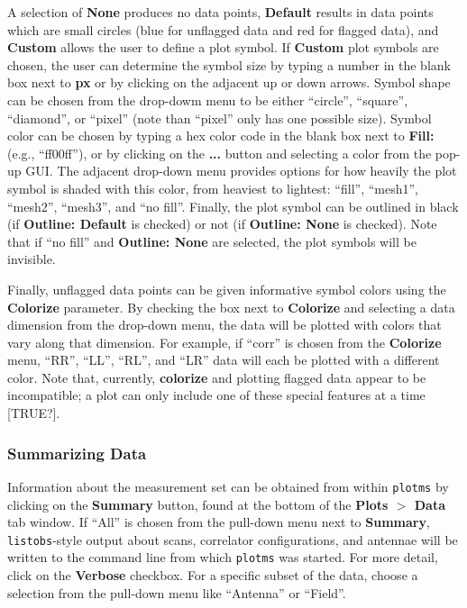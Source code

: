 A selection of {\bf None} produces no data points, {\bf Default} results in data points which are small circles (blue for unflagged data and red for flagged data), and {\bf Custom} allows the user to define a plot symbol. If {\bf Custom} plot symbols are chosen, the user can determine the symbol size by typing a number in the blank box next to {\bf px} or by clicking on the adjacent up or down arrows. Symbol shape can be chosen from the drop-dowm menu to be either ``circle'', ``square'', ``diamond'', or ``pixel'' (note than ``pixel'' only has one possible size). Symbol color can be chosen by typing a hex color code in the blank box next to {\bf Fill:} (e.g., ``ff00ff''), or by clicking on the {\bf ...} button and selecting a color from the pop-up GUI. The adjacent drop-down menu provides options for how heavily the plot symbol is shaded with this color, from heaviest to lightest: ``fill'', ``mesh1'', ``mesh2'', ``mesh3'', and ``no fill''. Finally, the plot symbol can be outlined in black (if {\bf Outline: Default} is checked) or not (if {\bf Outline: None} is checked). Note that if ``no fill'' and {\bf Outline: None} are selected, the plot symbols will be invisible.

Finally, unflagged data points can be given informative symbol colors using the {\bf Colorize} parameter. By checking the box next to {\bf Colorize} and selecting a data dimension from the drop-down menu, the data will be plotted with colors that vary along that dimension. For example, if ``corr'' is chosen from the {\bf Colorize} menu, ``RR'', ``LL'', ``RL'', and ``LR'' data will each be plotted with a different color. Note that, currently, {\bf colorize} and plotting flagged data appear to be incompatible; a plot can only include one of these special features at a time [TRUE?].


\subsubsection{Summarizing Data}
\label{section:edit.plot.plotms.summary}

Information about the measurement set can be obtained from within {\tt plotms} by clicking on the {\bf Summary} button, found at the bottom of the {\bf Plots $>$ Data} tab window. If ``All'' is chosen from the pull-down menu next to {\bf Summary}, {\tt listobs}-style output about scans, correlator configurations, and antennae will be written to the command line from which {\tt plotms} was started. For more detail, click on the {\bf Verbose} checkbox. For a specific subset of the data, choose a selection from the pull-down menu like ``Antenna'' or ``Field''.

